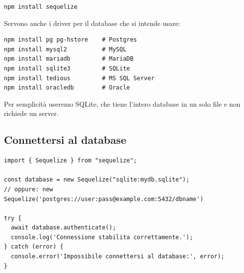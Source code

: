 \begin{lstlisting}[style=shell]
npm install sequelize
\end{lstlisting}

Servono anche i driver per il database che si intende usare:

\begin{lstlisting}[style=shell]
npm install pg pg-hstore    # Postgres
npm install mysql2          # MySQL
npm install mariadb         # MariaDB
npm install sqlite3         # SQLite
npm install tedious         # MS SQL Server
npm install oracledb        # Oracle
\end{lstlisting}

Per semplicità useremo SQLite, che tiene l'intero database in un solo file e
non richiede un server.

\subsection{Connettersi al database}

\begin{affianco}[0.62][c]
\codicepiccolo
\begin{lstlisting}[style=js, name=connect.js]
import { Sequelize } from "sequelize";

const database = new Sequelize("sqlite:mydb.sqlite");
// oppure: new Sequelize('postgres://user:pass@example.com:5432/dbname')

try {
  await database.authenticate();
  console.log('Connessione stabilita correttamente.');
} catch (error) {
  console.error('Impossibile connettersi al database:', error);
}
\end{lstlisting}
\risultato
\begin{immagine}
\end{immagine}
\end{affianco}

